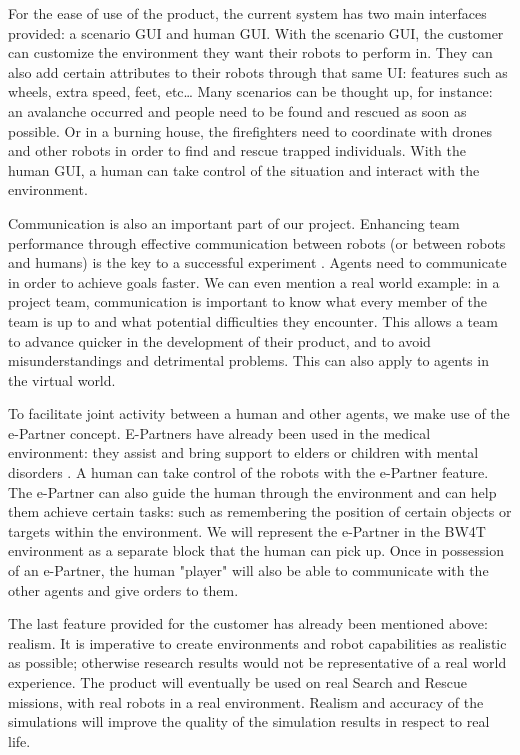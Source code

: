 \documentclass[oneside]{tudelft-report}
\begin{document}
For the ease of use of the product, the current system has two main interfaces provided: a scenario GUI and human GUI. With the scenario GUI, the customer can customize the environment they want their robots to perform in. They can also add certain attributes to their robots through that same UI: features such as wheels, extra speed, feet, etc… Many scenarios can be thought up, for instance: an avalanche occurred and people need to be found and rescued as soon as possible. Or in a burning house, the firefighters need to coordinate with drones and other robots in order to find and rescue trapped individuals. With the human GUI, a human can take control of the situation and interact with the environment. 

Communication is also an important part of our project. Enhancing team performance through effective communication between robots (or between robots and humans) is the key to a successful experiment \cite{communication}. Agents need to communicate in order to achieve goals faster. We can even mention a real world example: in a project team, communication is important to know what every member of the team is up to and what potential difficulties they encounter. This allows a team to advance quicker in the development of their product, and to avoid misunderstandings and detrimental problems. This can also apply to agents in the virtual world. 

To facilitate joint activity between a human and other agents, we make use of the e-Partner concept. E-Partners have already been used in the medical environment: they assist and bring support to elders or children with mental disorders \cite{Pelsmaeker}. A human can take control of the robots with the e-Partner feature. The e-Partner can also guide the human through the environment and can help them achieve certain tasks: such as remembering the position of certain objects or targets within the environment. We will represent the e-Partner in the BW4T environment as a separate block that the human can pick up. Once in possession of an e-Partner, the human "player" will also be able to communicate with the other agents and give orders to them.

The last feature provided for the customer has already been mentioned above: realism. It is imperative to create environments and robot capabilities as realistic as possible; otherwise research results would not be representative of a real world experience. The product will eventually be used on real Search and Rescue missions, with real robots in a real environment. Realism and accuracy of the simulations will improve the quality of the simulation results in respect to real life. 
\end{document}
